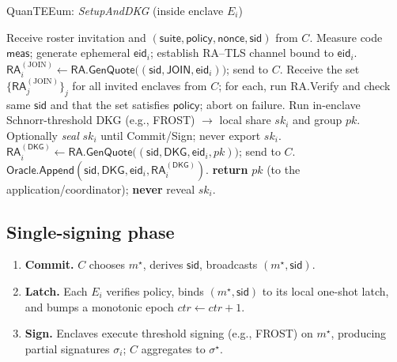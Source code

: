 \documentclass[runningheads,orivec]{llncs}
\newcommand{\prot}{\textsf{QuanTEEum}}
\newcommand{\FROST}{\textsf{FROST}}
\begin{document}
\begin{algorithm}[!htbp]
\caption{\prot{}: \emph{SetupAndDKG} (inside enclave $E_i$)}
\label{alg:setup}
\begin{small}
\begin{algorithmic}[1]
\State Receive roster invitation and $(\mathsf{suite},\mathsf{policy},\mathsf{nonce},\mathsf{sid})$ from $C$.
\State Measure code $\mathsf{meas}$; generate ephemeral $\mathsf{eid}_i$; establish RA--TLS channel bound to $\mathsf{eid}_i$.
\State $\mathsf{RA}^{(\mathrm{JOIN})}_i \gets \textsf{RA.GenQuote}\big((\mathsf{sid},\mathsf{JOIN},\mathsf{eid}_i)\big)$; send to $C$.
\State Receive the set $\{\mathsf{RA}^{(\mathrm{JOIN})}_j\}_j$ for all invited enclaves from $C$; for each, run \textsf{RA.Verify} and check same $\mathsf{sid}$ and that the set satisfies $\mathsf{policy}$; abort on failure.
\State Run in\mbox{-}enclave Schnorr-threshold DKG (e.g., \FROST{}) $\rightarrow$ local share $sk_i$ and group $pk$.
\State Optionally \emph{seal} $sk_i$ until Commit/Sign; never export $sk_i$.
\State $\mathsf{RA}^{(\mathsf{DKG})}_i \gets \textsf{RA.GenQuote}\big((\mathsf{sid},\mathsf{DKG},\mathsf{eid}_i,pk)\big)$; send to $C$.
\State $\textsf{Oracle.Append}(\mathsf{sid},\mathsf{DKG},\mathsf{eid}_i,\mathsf{RA}^{(\mathsf{DKG})}_i)$.
\State \textbf{return} $pk$ (to the application/coordinator); \textbf{never} reveal $sk_i$.
\end{algorithmic}
\end{small}
\end{algorithm}

\subsection{Single-signing phase}
\begin{enumerate}
  \item \textbf{Commit.} $C$ chooses $m^{\star}$, derives $\mathsf{sid}$, broadcasts $(m^{\star},\mathsf{sid})$.
  \item \textbf{Latch.} Each $E_i$ verifies policy, binds $(m^{\star},\mathsf{sid})$ to its local one-shot latch, and bumps a monotonic epoch $ctr \leftarrow ctr{+}1$.
  \item \textbf{Sign.} Enclaves execute threshold signing (e.g., \FROST{}) on $m^{\star}$, producing partial signatures $\sigma_i$; $C$ aggregates to $\sigma^{\star}$.
\end{enumerate}
\end{document}
